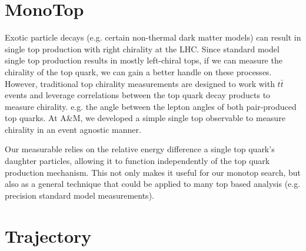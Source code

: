 \documentclass[11pt]{article}
\begin{document}
 
 
 \section{MonoTop}
 
 Exotic particle decays (e.g. certain non-thermal dark matter models) can result in single top production with right chirality at the LHC. Since standard model single top production results in mostly left-chiral tops, if we can measure the chirality of the top quark, we can gain a better handle on these processes. However, traditional top chirality measurements are designed to work with $t\bar{t}$ events and leverage correlations between the top quark decay products to measure chirality. e.g. the angle between the lepton angles of both pair-produced top quarks. At A\&M, we developed a simple single top observable to measure chirality in an event agnostic manner.
 
Our measurable relies on the relative energy difference a single top quark's daughter particles, allowing it to function independently of the top quark production mechanism. This not only makes it useful for our monotop search, but also as a general technique that could be applied to many top based analysis (e.g. precision standard model measurements). 

\section{Trajectory}
\end{document}
